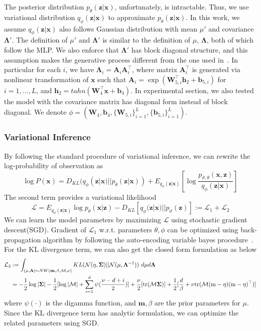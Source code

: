 The posterior distribution $p_{\theta}(\mathbf{z}|\mathbf{x})$, unfortunately, is intractable. Thus, we use variational distribution $q_{\phi}(\mathbf{z}|\mathbf{x})$ to approximate $p_{\theta}(\mathbf{z}|\mathbf{x})$.
In this work, we assume $q_{\phi}(\mathbf{z}|\mathbf{x})$ also follows Gaussian distribution with mean $\mu'$ and covariance $\mathbf{\Lambda}'$. The definition of $\mu'$ and $\mathbf{\Lambda}'$ is similar to the definition of $\mu$, $\mathbf{\Lambda}$, both of which follow the MLP. We also enforce that $\mathbf{\Lambda}'$ has block diagonal structure, and this assumption makes the generative process different from the one used in~\cite{kingma2013auto}. In particular for each $i$, we have $\mathbf{\Lambda}_i=\mathbf{A}_i\mathbf{A}_i^{\top}$, where matrix $\mathbf{A}_i^{\top}$ is generated via nonlinear transformation of $\mathbf{x}$ such that $\mathbf{A}_i=\exp(\mathbf{W}_{5,i}^{\top}\mathbf{h}_2+\mathbf{b}_{5,i})$ for $i=1,...,L$, and $\mathbf{h}_2=tahn(\mathbf{W}_4^{\top}\mathbf{x}+\mathbf{b}_4)$. In experimental section, we also tested the model with the covariance matrix has diagonal form instead of block diagonal. We denote $\phi=(\mathbf{W}_4, \mathbf{b}_4, \{\mathbf{W}_{5,i}\}_{i=1}^{L}, \{\mathbf{b}_{5,i}\}_{i=1}^{L})$.


\subsubsection{Variational Inference}
By following the standard procedure of variational inference, we can rewrite the log-probability of observation as
\[
\log P(\mathbf{x}) = D_{KL}(q_{\phi}(\mathbf{z}|\mathbf{x}) || p_{\theta}(\mathbf{z}|\mathbf{x})) + E_{q_{\phi}(\mathbf{z}|\mathbf{x})}[\log \frac{p_{\vartheta, \theta}(\mathbf{x},\mathbf{z})}{q_{\phi}(\mathbf{z}|\mathbf{x})}]
\]
The second term provides a variational likelihood
\[
\mathcal{L} = E_{q_{\phi}(\mathbf{z}|\mathbf{x})} \log p_{\theta}(\mathbf{x}|\mathbf{z}) - D_{KL}[q_{\phi}(\mathbf{z}|\mathbf{x})||p_{\vartheta}(\mathbf{z})] := \mathcal{L}_1 + \mathcal{L}_2
\]
We can learn the model parameters by maximizing $\mathcal{L}$ using stochastic gradient descent(SGD). Gradient of $\mathcal{L}_1$ w.r.t. parameters $\theta, \phi$ can be optimized using back-propagation algorithm by following the auto-encoding variable bayes procedure~\cite{kingma2013auto}. For the KL divergence term, we can also get the closed form formulation as below
\begin{align}
\notag \mathcal{L}_2 &:= \int_{(\mu, \mathbf{\Lambda})\sim NW(\mathbf{m}, \beta, \mathcal{M}, \nu)} KL(\mathcal{N}(\eta, \mathbf{\Sigma})||\mathcal{N}(\mu, \mathbf{\Lambda}^{-1})) \ d\mu d\mathbf{\Lambda} \\
\notag				& = -\frac{1}{2}\log|\mathbf{\Sigma}| - \frac{1}{2}[\log |\mathcal{M}| + \sum_{i=1}^{d}\psi(\frac{\nu-d+i}{2})] + \frac{\nu}{2}[\mbox{tr}(\mathcal{M}\mathbf{\Sigma})] + \frac{1}{2} [\frac{d}{\beta} + \nu \mbox{tr}(\mathcal{M}(\mbox{m}-\eta)(\mbox{m}-\eta)^{\top})]
\end{align}
where $\psi(\cdot)$ is the digamma function, and $\mathbf{m}, \beta$ are the prior parameters for $\mu$. Since the KL divergence term has analytic formulation, we can optimize the related parameters using SGD.


